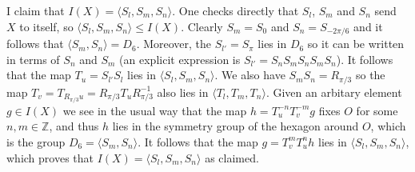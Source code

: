 \documentclass{amsart}
\renewcommand{\:}{\colon}
\newcommand{\ip}[1]{\langle #1\rangle}
\newcommand{\Z}{\mathbb{Z}}
\theoremstyle{definition}
\newenvironment{solution}{{\noindent\bf Solution:}}{}
\begin{document}
\begin{solution}
\begin{center}
 \end{center}
 I claim that $I(X)=\ip{S_l,S_m,S_n}$.  One checks directly that
 $S_l$, $S_m$ and $S_n$ send $X$ to itself, so
 $\ip{S_l,S_m,S_n}\leq I(X)$.  Clearly $S_m=S_0$ and $S_n=S_{-2\pi/6}$
 and it follows that $\ip{S_m,S_n}=D_6$.  Moreover, the $S_{l'}=S_\pi$
 lies in $D_6$ so it can be written in terms of $S_n$ and $S_m$ (an
 explicit expression is $S_{l'}=S_nS_mS_nS_mS_n$).  It follows that
 the map $T_u=S_{l'}S_l$ lies in $\ip{S_l,S_m,S_n}$.  We also have
 $S_mS_n=R_{\pi/3}$ so the map
 $T_v=T_{R_{\pi/3}u}=R_{\pi/3}T_uR_{\pi/3}^{-1}$ also lies in
 $\ip{T_l,T_m,T_n}$.  Given an arbitary element $g\in I(X)$ we see in
 the usual way that the map $h=T_u^{-n}T_v^{-m}g$ fixes $O$ for some
 $n,m\in\Z$, and thus $h$ lies in the symmetry group of the hexagon
 around $O$, which is the group $D_6=\ip{S_m,S_n}$.  It follows that
 the map $g=T_v^mT_u^nh$ lies in $\ip{S_l,S_m,S_n}$, which proves that
 $I(X)=\ip{S_l,S_m,S_n}$ as claimed.
\end{solution}
\end{document}
